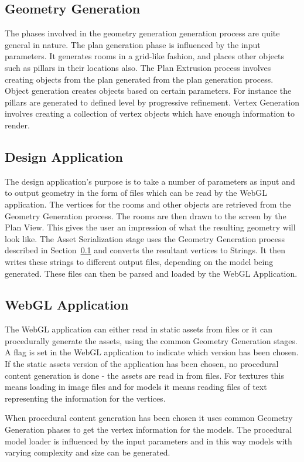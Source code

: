 \subsection{Geometry Generation}
\label{sec:desgeomgen}
The phases involved in the geometry generation generation process are quite general in nature.
The plan generation phase is influenced by the input parameters.
It generates rooms in a grid-like fashion, and places other objects such as pillars in their locations also.
The Plan Extrusion process involves creating objects from the plan generated from the plan generation process.
Object generation creates objects based on certain parameters.
For instance the pillars are generated to defined level by progressive refinement.
Vertex Generation involves creating a collection of vertex objects which have enough information to render.

\subsection{Design Application}
The design application's purpose is to take a number of parameters as input and to output geometry in the form of files which can be read by the WebGL application.
The vertices for the rooms and other objects are retrieved from the Geometry Generation process.
The rooms are then drawn to the screen by the Plan View.
This gives the user an impression of what the resulting geometry will look like.
The Asset Serialization stage uses the Geometry Generation process described in Section~\ref{sec:desgeomgen} and converts the resultant vertices to Strings.
It then writes these strings to different output files, depending on the model being generated. 
These files can then be parsed and loaded by the WebGL Application.

\subsection{WebGL Application}
The WebGL application can either read in static assets from files or it can procedurally generate the assets, using the common Geometry Generation stages.
A flag is set in the WebGL application to indicate which version has been chosen.
If the static assets version of the application has been chosen, no procedural content generation is done - the assets are read in from files.
For textures this means loading in image files and for models it means reading files of text representing the information for the vertices.

When procedural content generation has been chosen it uses common Geometry Generation phases to get the vertex information for the models.
The procedural model loader is influenced by the input parameters and in this way models with varying complexity and size can be generated.
